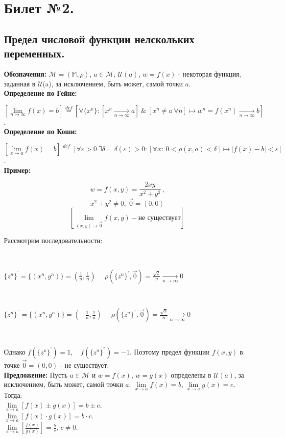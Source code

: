 \documentclass[a4paper,14pt]{extreport}
\begin{document}
\section*{Билет №2.}

\subsection*{Предел числовой функции нелскольких переменных.}

\textbf{Обозначения:}
$\mathscr{M} = (\mathbb{M}, \rho)$, $a \in \mathscr{M}$, $\mathscr{U}(a)$,
$w = f(x)$ - некоторая функция, заданная в $\mathscr{U}$(a), за исключением, быть может, самой точки $a$.
	\\
\textbf{Определение по Гейне:}
	
	$[\lim\limits_{n \to \infty}f(x) = b] \stackrel{def}{=} \left[ \forall \{x^n\}: 
	[x^n \xrightarrow[n \rightarrow \infty]{} a] ~ \& ~ [x^n \neq a ~ \forall n] \mapsto 
	w^n = f(x^n) \xrightarrow[n \rightarrow \infty]{} b\right]$.
\\
\textbf{Определение по Коши:}

	$[\lim\limits_{x \to a}f(x) = b] \stackrel{def}{=} \left[\forall \varepsilon > 0 ~ 
	\exists\delta = \delta(\varepsilon) > 0: 
	[\forall x: ~ 0 < \rho (x, a) < \delta] \mapsto |f(x) - b| < \varepsilon\right]$.
\\	
\textbf{Пример:}
	
	$$w = f(x, y) = \frac{2xy}{x^2 + y^2} ~ \text{,}$$
	$$x^2 + y^2 \neq 0, ~ \vec{0} = (0, 0)$$
	$$[\lim\limits_{(x,y) \to \vec{0}}f(x, y) - \text{не существует}]$$

	Рассмотрим последовательности:

	\

	$\{z^n\}^\text{'} = \{(x^n, y^n)\} = \left(\frac{1}{n}, \frac{1}{n}\right)$ 
	$\quad \rho(\{z^n\}^\text{'}, \vec{0}) = \frac{\sqrt2}{n} \xrightarrow[n \rightarrow \infty]{} 0$

	\
	
	$\{z^n\}^\text{''} = \{(x^n, y^n)\} = \left(-\frac{1}{n}, \frac{1}{n}\right)$
	$\quad \rho(\{z^n\}^\text{''}, \vec{0}) = \frac{\sqrt2}{n} \xrightarrow[n \rightarrow \infty]{} 0$

	\

	Однако
	$f(\{z^n\}^\text{'}) = 1, \quad f(\{z^n\}^\text{''}) = -1$. Поэтому предел функции $f(x, y)$ в точке
	$\vec{0} = (0, 0)$ - не существует.
	\\
\textbf{Предложение:} Пусть $a \in \mathscr{M} \text{ и } w = f(x) \text{, } w = g(x)$ определены
	в $\mathscr{U}(a)$, за исключением, быть может, самой точки $a$;
	$\lim\limits_{x \to a}f(x) = b$, $\lim\limits_{x \to a}g(x) = c$. Тогда:
	\\ 
	$\lim\limits_{x \to a}[f(x) \pm g(x) ] = b \pm c$.
	\\ 
	$\lim\limits_{x \to a}[f(x) \cdot g(x) ] = b \cdot c$.
	\\ 
	$\lim\limits_{x \to a}\left[\frac{f(x)}{g(x)}\right] = \frac{b}{c} \text{, } c \neq 0$.
	
\end{document}
